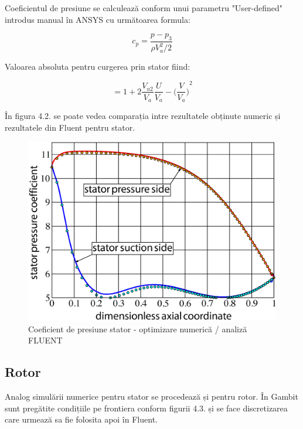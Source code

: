 Coeficientul de presiune se calculează conform unui parametru "User-defined" introdus manual în ANSYS cu următoarea formula:

\begin{equation}
c_p = \frac{p-p_3}{\rho V_a^2 / 2}
\end{equation}

Valoarea absoluta pentru curgerea prin stator fiind:

\begin{equation}
= 1 + 2 \frac{V_{u2}}{V_a} \frac{U}{V_a} - {\Big(\frac{V}{V_a}\Big)}^2
\end{equation}

În figura 4.2. se poate vedea comparația intre rezultatele obținute numeric și rezultatele din Fluent pentru stator.

\begin{figure}[h]
	\centering
	\includegraphics[scale=0.4]{figures/cp-stator-ezdraw.eps}
	\caption{Coeficient de presiune stator - optimizare numerică / analiză FLUENT}
	\label{Coeficient de presiune stator - optimizare numerică / analiză FLUENT}
\end{figure}

\clearpage

\subsection{Rotor}

Analog simulării numerice pentru stator se procedează și pentru rotor. În Gambit sunt pregătite condițiile pe frontiera conform figurii 4.3. și se face discretizarea care urmează sa fie folosita apoi în Fluent.

